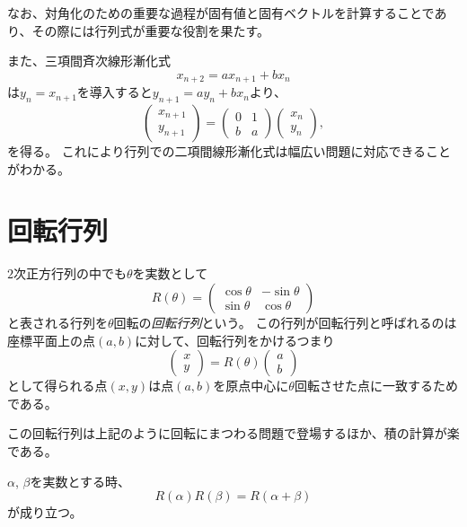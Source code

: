 なお、対角化のための重要な過程が固有値と固有ベクトルを計算することであり、その際には行列式が重要な役割を果たす。

また、三項間斉次線形漸化式
$$
x_{n+2} = a x_{n+1}+b x_n
$$
は$y_n = x_{n+1}$を導入すると$y_{n+1} = a y_n+b x_n$より、
$$
\begin{pmatrix}x_{n+1} \\ y_{n+1}\end{pmatrix}
= \begin{pmatrix}0 & 1 \\ b & a\end{pmatrix}\begin{pmatrix}x_n \\ y_n\end{pmatrix},
$$
を得る。
これにより行列での二項間線形漸化式は幅広い問題に対応できることがわかる。

\section{回転行列}

$2$次正方行列の中でも$\theta$を実数として
$$
R(\theta) = \begin{pmatrix}\cos\theta & -\sin\theta \\ \sin\theta & \cos\theta\end{pmatrix}
$$
と表される行列を$\theta$回転の\emph{回転行列}という。
この行列が回転行列と呼ばれるのは座標平面上の点$(a, b)$に対して、回転行列をかけるつまり
$$
\begin{pmatrix}x \\ y\end{pmatrix}
= R(\theta)\begin{pmatrix}a \\ b\end{pmatrix}
$$
として得られる点$(x, y)$は点$(a, b)$を原点中心に$\theta$回転させた点に一致するためである。

この回転行列は上記のように回転にまつわる問題で登場するほか、積の計算が楽である。

\begin{proposition}[回転行列の積]
$\alpha$, $\beta$を実数とする時、
$$
R(\alpha)R(\beta) = R(\alpha+\beta)
$$
が成り立つ。
\end{proposition}

